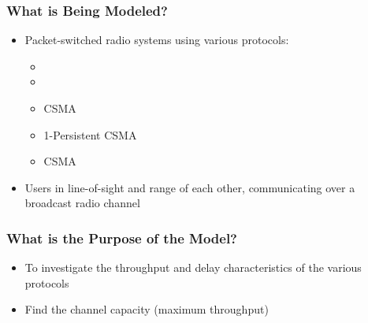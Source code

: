 \subsubsection{What is Being Modeled?}\label{subsubsec:Kleinrock_Tobagi_Model_What_Modeled}
\begin{itemize}[noitemsep]
\item Packet-switched radio systems using various protocols:
  \begin{itemize}[noitemsep]
  \item {}
  \item {}
  \item {} CSMA
  \item 1-Persistent CSMA
  \item {} CSMA
\end{itemize}

\item Users in line-of-sight and range of each other, communicating over a broadcast radio channel
\end{itemize}

\subsubsection{What is the Purpose of the Model?}\label{subsubsec:Kleinrock_Tobagi_Model_Purpose}
\begin{itemize}[noitemsep]
\item To investigate the throughput and delay characteristics of the various protocols
\item Find the channel capacity (maximum throughput)
\end{itemize}


